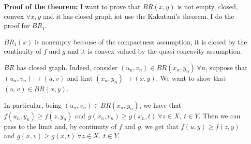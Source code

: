 \bigskip
\noindent \textbf{Proof of the theorem:} I want to prove that $BR(x,y)$ is 
not empty, closed, convex $\forall x,y$ and it has closed graph iot use 
the Kakutani's theorem. I do the proof for $BR_1$.

\noindent $BR_1(x)$ is nonempty because of the compactness assumption, it is closed by the continuity of $f$ and $g$ and it is convex valued by the quasi-concavity assumption.

\noindent $BR$ has closed graph. Indeed, consider $(u_n,v_n) \in 
BR(x_n,y_n) ~\forall n$, suppose that $(u_n,v_n) \rightarrow (u,v)$ 
and that $(x_n,y_n) \rightarrow (x,y)$. We want to show that 
$(u,v) \in BR(x,y)$.

\noindent In particular, being $(u_n,v_n) \in BR(x_n,y_n)$, we have that $f(u_n,y_n) \geq f(z,y_n)$ and $g(x_n,v_n) \geq g(x_n,t) ~
\forall z \in X, ~t \in Y$. Then we can pass to the limit and, by continuity of $f$ and $g$, we get that $f(u,y) \geq f(z,y)$ and $g(x,v) \geq g(x,t) ~\forall z \in X, ~t \in Y$.

%

%

